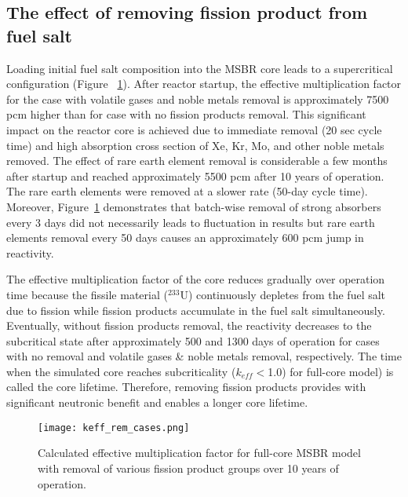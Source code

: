 \subsection{The effect of removing fission product from fuel salt}
Loading initial fuel salt composition into the \gls{MSBR} core leads to a 
supercritical configuration (Figure ~\ref{fig:fp_removal}). After reactor 
startup, the effective multiplication factor for the case with volatile gases 
and noble metals removal is approximately 7500 pcm  higher than for case with 
no fission products removal. This significant impact on the reactor core is
achieved due to immediate removal (20 sec cycle time) and high absorption cross 
section of Xe, Kr, Mo, and other noble metals removed. The effect of rare earth 
element removal is considerable a few months after startup and reached 
approximately 5500 pcm after 10 years of operation. The rare earth elements were 
removed at a slower rate (50-day cycle time). Moreover, 
Figure~\ref{fig:fp_removal} demonstrates that batch-wise removal of strong 
absorbers every 3 days did not necessarily leads to fluctuation in results 
but rare earth elements removal every 50 days causes an approximately 600 pcm jump 
in reactivity.

The effective multiplication factor of the core reduces gradually over 
operation time because the fissile material ($^{233}$U) continuously depletes 
from the fuel salt due to fission while fission products 
accumulate in the fuel salt simultaneously. Eventually, without fission products removal, 
the reactivity decreases to the subcritical state after approximately 500 and 
1300 days of operation for cases with no removal and volatile gases \& noble 
metals removal, respectively. The time when the simulated core reaches 
subcriticality ($k_{eff}<$1.0) for full-core model) is called the core lifetime. 
Therefore, removing fission products provides with significant neutronic benefit 
and enables a longer core lifetime.
\begin{figure}[ht!] %
  \centering
  \texttt{[image: keff\_rem\_cases.png]} 
  \caption{Calculated effective multiplication factor for full-core \gls{MSBR} 
model with removal of various fission product groups over 10 years of 
operation.}
  \label{fig:fp_removal}
\end{figure}
